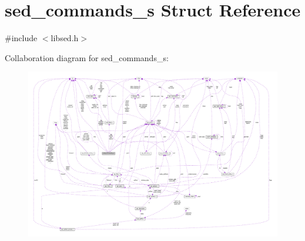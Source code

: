 \hypertarget{structsed__commands__s}{}\section{sed\+\_\+commands\+\_\+s Struct Reference}
\label{structsed__commands__s}


{\ttfamily \#include $<$libsed.\+h$>$}



Collaboration diagram for sed\+\_\+commands\+\_\+s\+:
\nopagebreak
\begin{figure}[H]
\begin{center}
\leavevmode
\includegraphics[width=350pt]{structsed__commands__s__coll__graph}
\end{center}
\end{figure}
